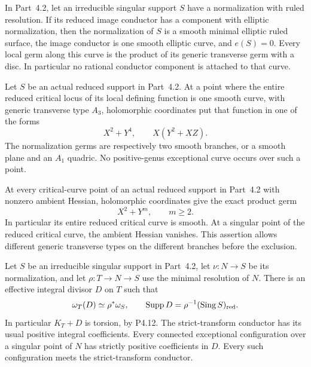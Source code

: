 \begin{proposition}[P4R.13]\hypertarget{tag-02Y6}{}\label{night:P4R.13}\label{stmt:P4R.13}


In Part~4.2, let an irreducible singular support $S$ have a
normalization with ruled resolution. If its reduced image
conductor has a component with elliptic normalization, then
the normalization of $S$ is a smooth minimal elliptic ruled
surface, the image conductor is one smooth elliptic curve,
and $e(S)=0$. Every local germ along this curve is the product
of its generic transverse germ with a disc. In particular no
rational conductor component is attached to that curve.
\end{proposition}

\begin{proposition}[P4R.14]\hypertarget{tag-02Y7}{}\label{night:P4R.14}\label{stmt:P4R.14}


Let $S$ be an actual reduced support in Part~4.2. At a point
where the entire reduced critical locus of its local defining
function is one smooth curve, with generic transverse type
$A_3$, holomorphic coordinates put that function in one of
the forms
\[
 X^2+Y^4,\qquad X(Y^2+XZ).                              \tag{P4R.14.1}
\]
The normalization germs are respectively two smooth branches,
or a smooth plane and an $A_1$ quadric. No positive-genus
exceptional curve occurs over such a point.
\end{proposition}

\begin{proposition}[P4R.15]\hypertarget{tag-02Y8}{}\label{night:P4R.15}\label{stmt:P4R.15}


At every critical-curve point of an actual reduced support in
Part~4.2 with nonzero ambient Hessian, holomorphic coordinates
give the exact product germ
\[
                       X^2+Y^m,\qquad m\ge2.
\]
In particular its entire reduced critical curve is smooth.
At a singular point of the reduced critical curve, the ambient
Hessian vanishes. This assertion allows different generic
transverse types on the different branches before the exclusion.
\end{proposition}

\begin{proposition}[P4R.6]\hypertarget{tag-02YI}{}\label{night:P4R.6}\label{stmt:P4R.6}


Let $S$ be an irreducible singular support in
Part~4.2, let $\nu:N\to S$ be its normalization,
and let $\rho:T\to N\to S$ use the minimal
resolution of $N$. There is an effective integral
divisor $D$ on $T$ such that
\[
 \omega_T(D)\simeq\rho^*\omega_S,
 \qquad \operatorname{Supp}D
       =\rho^{-1}(\operatorname{Sing}S)_{\rm red}.
\]
In particular $K_T+D$ is torsion, by P4.12.
The strict-transform conductor has its usual
positive integral coefficients. Every connected
exceptional configuration over a singular point
of $N$ has strictly positive coefficients in $D$.
Every such configuration meets the strict-transform
conductor.
\end{proposition}

